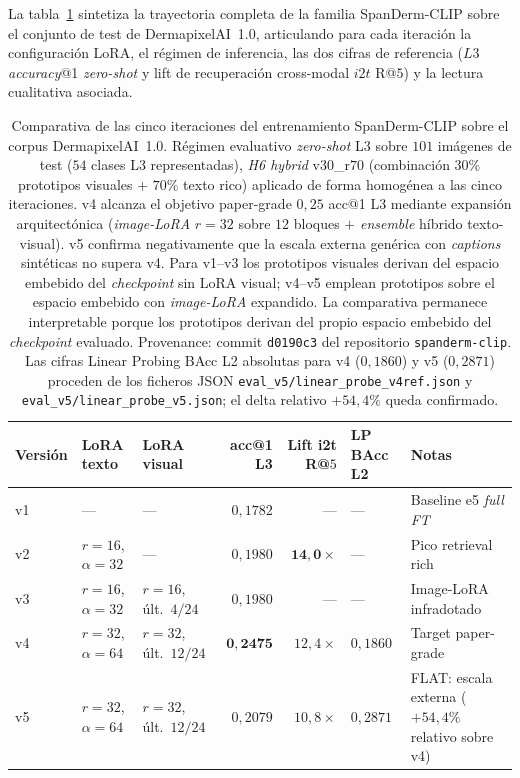 La tabla~\ref{tab:spanderm_iteraciones} sintetiza la trayectoria
completa de la familia SpanDerm-CLIP sobre el conjunto de test
de DermapixelAI~1.0, articulando para cada iteración la
configuración LoRA, el régimen de inferencia, las dos cifras de
referencia ($L3$ \emph{accuracy}@1 \emph{zero-shot} y lift de
recuperación cross-modal $i2t$ R@$5$) y la lectura cualitativa
asociada.

\begin{table}[H]
\centering
\footnotesize
\setlength{\tabcolsep}{3pt}
\renewcommand{\arraystretch}{1.05}
\caption{Comparativa de las cinco iteraciones del entrenamiento
SpanDerm-CLIP sobre el corpus DermapixelAI~1.0. Régimen evaluativo
\emph{zero-shot} L3 sobre $101$ imágenes de test ($54$ clases L3
representadas), \emph{H6 hybrid} v$30$\_r$70$ (combinación
$30\%$ prototipos visuales $+$ $70\%$ texto rico) aplicado de
forma homogénea a las cinco iteraciones. v4 alcanza el objetivo
paper-grade $0{,}25$ acc@1 L3 mediante expansión arquitectónica
(\emph{image-LoRA} $r=32$ sobre $12$ bloques $+$ \emph{ensemble}
híbrido texto-visual). v5 confirma negativamente que la escala
externa genérica con \emph{captions} sintéticas no supera v4. Para
v1--v3 los prototipos visuales derivan del espacio embebido del
\emph{checkpoint} sin LoRA visual; v4--v5 emplean prototipos
sobre el espacio embebido con \emph{image-LoRA} expandido. La
comparativa permanece interpretable porque los prototipos derivan
del propio espacio embebido del \emph{checkpoint} evaluado.
Provenance: commit \texttt{d0190c3} del repositorio
\texttt{spanderm-clip}. Las cifras Linear Probing BAcc L2 absolutas
para v4 ($0{,}1860$) y v5 ($0{,}2871$) proceden de los ficheros
JSON \texttt{eval\_v5/linear\_probe\_v4ref.json} y
\texttt{eval\_v5/linear\_probe\_v5.json}; el delta relativo
$+54{,}4\%$ queda confirmado.}
\label{tab:spanderm_iteraciones}
\begin{tabular}{lllrrll}
\hline
Versión & LoRA texto & LoRA visual & acc@1 L3 & Lift i2t R@$5$ & LP BAcc L2 & Notas \\
\hline
v1 & ---                       & ---                          & $0{,}1782$          & ---                       & ---                                 & Baseline e5 \emph{full FT} \\
v2 & $r=16$, $\alpha=32$       & ---                          & $0{,}1980$          & $\mathbf{14{,}0\times}$   & ---                                 & Pico retrieval rich \\
v3 & $r=16$, $\alpha=32$       & $r=16$, últ.~$4/24$           & $0{,}1980$          & ---                       & ---                                 & Image-LoRA infradotado \\
v4 & $r=32$, $\alpha=64$       & $r=32$, últ.~$12/24$          & $\mathbf{0{,}2475}$ & $12{,}4\times$            & $0{,}1860$   & Target paper-grade \\
v5 & $r=32$, $\alpha=64$       & $r=32$, últ.~$12/24$          & $0{,}2079$          & $10{,}8\times$            & $0{,}2871$   & FLAT: escala externa ($+54{,}4\%$ relativo sobre v4) \\
\hline
\end{tabular}


\end{table}
